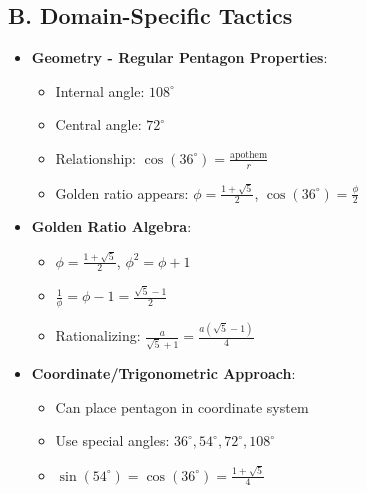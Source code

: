 \documentclass[12pt]{article}
\begin{document}
\begin{tacticalbox}
\subsection*{B. Domain-Specific Tactics}
\begin{itemize}[leftmargin=*]
    \item \textbf{Geometry - Regular Pentagon Properties}:
    \begin{itemize}
        \item Internal angle: $108^\circ$
        \item Central angle: $72^\circ$
        \item Relationship: $\cos(36^\circ) = \frac{\text{apothem}}{r}$
        \item Golden ratio appears: $\phi = \frac{1+\sqrt{5}}{2}$, $\cos(36^\circ) = \frac{\phi}{2}$
    \end{itemize}
    \item \textbf{Golden Ratio Algebra}:
    \begin{itemize}
        \item $\phi = \frac{1+\sqrt{5}}{2}$, $\phi^2 = \phi + 1$
        \item $\frac{1}{\phi} = \phi - 1 = \frac{\sqrt{5}-1}{2}$
        \item Rationalizing: $\frac{a}{\sqrt{5}+1} = \frac{a(\sqrt{5}-1)}{4}$
    \end{itemize}
    \item \textbf{Coordinate/Trigonometric Approach}:
    \begin{itemize}
        \item Can place pentagon in coordinate system
        \item Use special angles: $36^\circ, 54^\circ, 72^\circ, 108^\circ$
        \item $\sin(54^\circ) = \cos(36^\circ) = \frac{1+\sqrt{5}}{4}$
    \end{itemize}
\end{itemize}


\end{tacticalbox}
\end{document}
